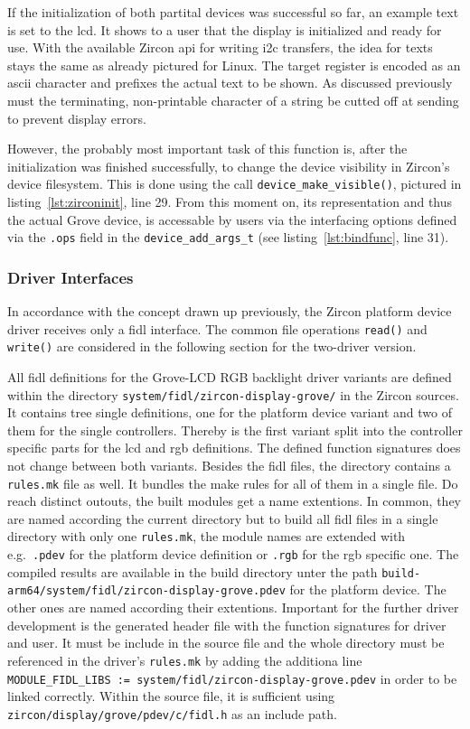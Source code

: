 If the initialization of both partital devices was successful so far, an example text is set to the \ac{lcd}.
It shows to a user that the display is initialized and ready for use.
With the available Zircon \ac{api} for writing \ac{i2c} transfers, the idea for texts stays the same as already pictured for Linux.
The target register is encoded as an \ac{ascii} character and prefixes the actual text to be shown.
As discussed previously must the terminating, non-printable character of a string be cutted off at sending to prevent display errors.

However, the probably most important task of this function is, after the initialization was finished successfully, to change the device visibility in Zircon's device filesystem.
This is done using the call \texttt{device_make_visible()}, pictured in listing~\ref{lst:zirconinit}, line 29.
From this moment on, its representation and thus the actual Grove device, is accessable by users via the interfacing options defined via the \texttt{.ops} field in the \texttt{device_add_args_t} (see listing~\ref{lst:bindfunc}, line 31).

\subsubsection{Driver Interfaces}
In accordance with the concept drawn up previously, the Zircon platform device driver receives only a \ac{fidl} interface.
The common file operations \texttt{read()} and \texttt{write()} are considered in the following section for the two-driver version.

All \ac{fidl} definitions for the Grove-LCD RGB backlight driver variants are defined within the directory \texttt{system/fidl/zircon-display-grove/} in the Zircon sources.
It contains tree single definitions, one for the platform device variant and two of them for the single controllers.
Thereby is the first variant split into the controller specific parts for the \ac{lcd} and \ac{rgb} definitions.
The defined function signatures does not change between both variants.
Besides the \ac{fidl} files, the directory contains a \texttt{rules.mk} file as well.
It bundles the make rules for all of them in a single file.
Do reach distinct outouts, the built modules get a name extentions.
In common, they are named according the current directory but to build all \ac{fidl} files in a single directory with only one \texttt{rules.mk}, the module names are extended with e.g.\ \texttt{.pdev} for the platform device definition or \texttt{.rgb} for the \ac{rgb} specific one. 
The compiled results are available in the build directory unter the path \texttt{build-arm64/system/fidl/zircon-display-grove.pdev} for the platform device.
The other ones are named according their extentions.
Important for the further driver development is the generated header file with the function signatures for driver and user.
It must be include in the source file and the whole directory must be referenced in the driver's \texttt{rules.mk} by adding the additiona line \texttt{MODULE_FIDL_LIBS := system/fidl/zircon-display-grove.pdev} in order to be linked correctly.
Within the source file, it is sufficient using \texttt{zircon/display/grove/pdev/c/fidl.h} as an include path.


